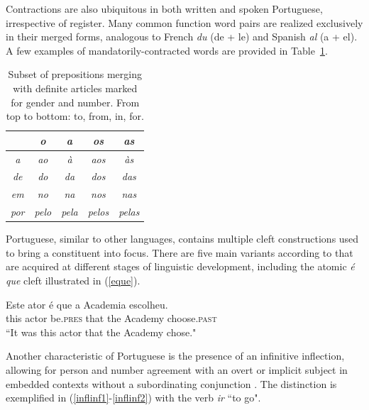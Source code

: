 Contractions are also ubiquitous in both written and spoken Portuguese, irrespective of register. Many common function word pairs are realized exclusively in their merged forms, analogous to French \textit{du} (de + le) and Spanish \textit{al} (a + el). A few examples of mandatorily-contracted words are provided in Table~\ref{tab:contractions}.

\begin{table}[ht]
\renewcommand{\arraystretch}{1.2}
    \centering
    \begin{tabular}{@{}c|cccc@{}}
         & \textit{o} & \textit{a} & \textit{os} & \textit{as} \\
        \hline
        \textit{a} & \textit{ao} & \textit{à} & \textit{aos} & \textit{às} \\
        \textit{de} & \textit{do} & \textit{da} & \textit{dos} & \textit{das} \\
        \textit{em} & \textit{no} & \textit{na} & \textit{nos} & \textit{nas} \\
        \textit{por} & \textit{pelo} & \textit{pela} & \textit{pelos} & \textit{pelas} \\
    \end{tabular}
    \caption{Subset of prepositions merging with definite articles marked for gender and number. From top to bottom: to, from, in, for.}
    \label{tab:contractions}
\end{table}

Portuguese, similar to other languages, contains multiple cleft constructions used to bring a constituent into focus. There are five main variants according to \cite{lobo2019} that are acquired at different stages of linguistic development, including the atomic \textit{é que} cleft illustrated in (\ref{eque}).

\begin{exe}
\ex\label{eque}
\gll Este ator é que a Academia escolheu.\\
this actor be.{\scshape pres} that the Academy choose.{\scshape past}\\
\glt ``It was this actor that the Academy chose." \citep{lobo2019}
\end{exe}

Another characteristic of Portuguese is the presence of an infinitive inflection, allowing for person and number agreement with an overt or implicit subject in embedded contexts without a subordinating conjunction \citep{inf, inflinf}. The distinction is exemplified in (\ref{inflinf1}-\ref{inflinf2}) with the verb \textit{ir} ``to go".

